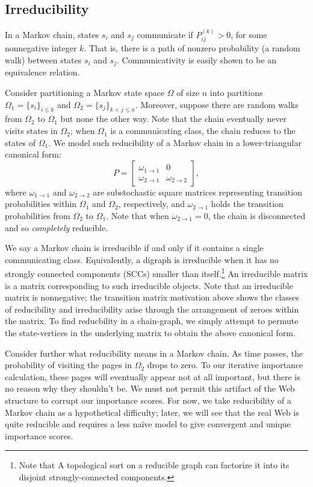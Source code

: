 \documentclass[11pt,letterpaper]{amsart}
\newcommand{\iterate}[2]{#1^{(#2)}}
\begin{document}
\subsection{Irreducibility}
In a Markov chain, states $s_i$ and $s_j$ communicate if
$\iterate{P}{k}_{ij} > 0$, for some nonnegative integer $k$. That is, there is a
path of nonzero probability (a random walk) between states $s_i$ and $s_j$.
Communicativity is easily shown to be an equivalence relation.

Consider partitioning a Markov state space $\Omega$ of size $n$ into partitions
$\Omega_1 = \{ s_i \}_{i\leq k}$ and $\Omega_2 = \{ s_j \}_{k < j \leq n}$.
Moreover, suppose there are random walks from $\Omega_2$ to $\Omega_1$ but none
the other way. Note that the chain eventually never visits states in $\Omega_2$;
when $\Omega_1$ is a communicating class, the chain reduces to the states of
$\Omega_1$. We model such reducibility of a Markov chain in a lower-triangular
canonical form:
\begin{equation*}
  \label{eqn:reducible}
  P =
  \begin{bmatrix}
    \omega_{1\to 1} & 0 \\
    \omega_{2 \to 1} & \omega_{2 \to 2}
  \end{bmatrix},
\end{equation*}
where $\omega_{1\to 1}$ and $\omega_{2\to 2}$ are substochastic square matrices
representing transition probabilities within $\Omega_1$ and $\Omega_2$,
respectively, and $\omega_{2 \to 1}$ holds the transition probabilities from
$\Omega_2$ to $\Omega_1$. Note that when $\omega_{2\to 1} = 0$, the chain is
disconnected and so \textit{completely} reducible.

We say a Markov chain is irreducible if and only if it contains a single
communicating class. Equivalently, a digraph is irreducible when it has no
strongly connected components (SCCs) smaller than itself.\footnote{Note that A
  topological sort on a reducible graph can factorize it into its disjoint
  strongly-connected components.} An irreducible matrix is a matrix
corresponding to such irreducible objects. Note that an irreducible matrix is
nonnegative; the transition matrix motivation above shows the classes of
reducibility and irreducibility arise through the arrangement of zeroes within
the matrix. To find reducbility in a chain-graph, we simply attempt to permute
the state-vertices in the underlying matrix to obtain the above canonical form.

Consider further what reducibility means in a Markov chain. As time passes, the
probability of visiting the pages in $\Omega_2$ drops to zero. To our iterative
importance calculation, these pages will eventually appear not at all important,
but there is no reason why they shouldn't be. We must not permit this artifact
of the Web structure to corrupt our importance scores. For now, we take
reducibility of a Markov chain as a hypothetical difficulty; later, we will see
that the real Web is quite reducible and requires a less naïve model to give
convergent and unique importance scores.
\end{document}

